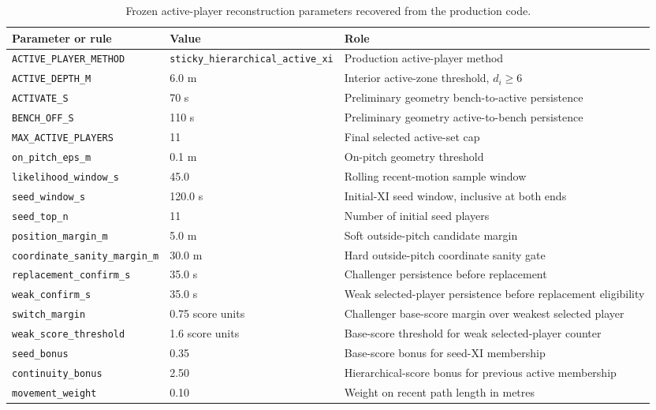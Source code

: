 \begin{table}[tbp]
\centering
\caption{Frozen active-player reconstruction parameters recovered from the production code.}
\label{tab:active-player-reconstruction-parameters}
\begin{tabular}{lll}
\hline
Parameter or rule & Value & Role \\
\hline
\texttt{ACTIVE\_PLAYER\_METHOD} & \texttt{sticky\_hierarchical\_active\_xi} & Production active-player method \\
\texttt{ACTIVE\_DEPTH\_M} & 6.0 m & Interior active-zone threshold, \(d_i\ge6\) \\
\texttt{ACTIVATE\_S} & 70 s & Preliminary geometry bench-to-active persistence \\
\texttt{BENCH\_OFF\_S} & 110 s & Preliminary geometry active-to-bench persistence \\
\texttt{MAX\_ACTIVE\_PLAYERS} & 11 & Final selected active-set cap \\
\texttt{on\_pitch\_eps\_m} & 0.1 m & On-pitch geometry threshold \\
\texttt{likelihood\_window\_s} & 45.0 & Rolling recent-motion sample window \\
\texttt{seed\_window\_s} & 120.0 s & Initial-XI seed window, inclusive at both ends \\
\texttt{seed\_top\_n} & 11 & Number of initial seed players \\
\texttt{position\_margin\_m} & 5.0 m & Soft outside-pitch candidate margin \\
\texttt{coordinate\_sanity\_margin\_m} & 30.0 m & Hard outside-pitch coordinate sanity gate \\
\texttt{replacement\_confirm\_s} & 35.0 s & Challenger persistence before replacement \\
\texttt{weak\_confirm\_s} & 35.0 s & Weak selected-player persistence before replacement eligibility \\
\texttt{switch\_margin} & 0.75 score units & Challenger base-score margin over weakest selected player \\
\texttt{weak\_score\_threshold} & 1.6 score units & Base-score threshold for weak selected-player counter \\
\texttt{seed\_bonus} & 0.35 & Base-score bonus for seed-XI membership \\
\texttt{continuity\_bonus} & 2.50 & Hierarchical-score bonus for previous active membership \\
\texttt{movement\_weight} & 0.10 & Weight on recent path length in metres \\

\end{tabular}
\end{table}
